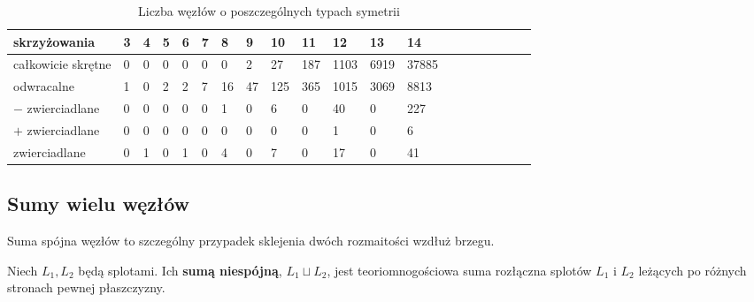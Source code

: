 \begin{table}[h]
    \centering
    \begin{tabular}{@{}*{20}l@{}} \toprule
        skrzyżowania & 3 & 4 & 5 & 6 & 7 & 8 & 9 & 10 & 11 & 12 & 13 & 14 \\ \midrule
        całkowicie skrętne & 0 & 0 & 0 & 0 & 0 & 0 & 2 & 27 & 187 & 1103 & 6919 & 37885 \\
        odwracalne & 1 & 0 & 2 & 2 & 7 & 16 & 47 & 125 & 365 & 1015 & 3069 & 8813 \\
        $-$ zwierciadlane & 0 & 0 & 0 & 0 & 0 & 1 & 0 & 6 & 0 & 40 & 0 & 227 \\
        $+$ zwierciadlane & 0 & 0 & 0 & 0 & 0 & 0 & 0 & 0 & 0 & 1 & 0 & 6 \\
        zwierciadlane & 0 & 1 & 0 & 1 & 0 & 4 & 0 & 7 & 0 & 17 & 0 & 41 \\
        \bottomrule
        \hline
    \end{tabular}
    \caption{Liczba węzłów o poszczególnych typach symetrii}
    \label{tablica_wezlow}
\end{table}


\subsection{Sumy wielu węzłów} %
\label{sub:knot_sum}
Suma spójna węzłów to szczególny przypadek sklejenia dwóch rozmaitości wzdłuż brzegu.

\begin{definition}
    Niech $L_1, L_2$ będą splotami.
    Ich \textbf{sumą niespójną}, $L_1 \sqcup L_2$,
    jest teoriomnogościowa suma rozłączna splotów
    $L_1$ i $L_2$ leżących po różnych stronach pewnej płaszczyzny.
\end{definition}

